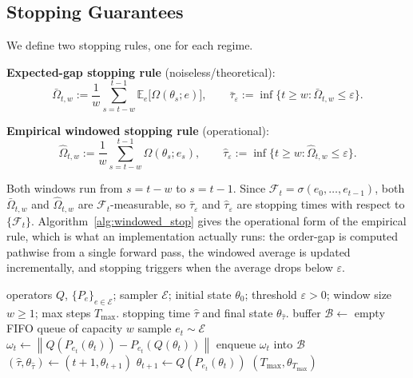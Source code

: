 \documentclass[12pt,a4paper]{article}
\newcommand{\E}{\mathcal{E}}
\newcommand{\norm}[1]{\left\lVert#1\right\rVert}
\newcommand{\Ogap}{\Omega}
\begin{document}
\subsection{Stopping Guarantees}
\label{sec:theory_stopping}

We define two stopping rules, one for each regime.

\textbf{Expected-gap stopping rule} (noiseless/theoretical):
\begin{equation}
\label{eq:expected_window}
\bar\Ogap_{t,w} := \frac{1}{w} \sum_{s = t-w}^{t-1}
  \mathbb{E}_e\bigl[\Ogap(\theta_s; e)\bigr],
\qquad
\bar\tau_\varepsilon := \inf\bigl\{t \geq w :
  \bar\Ogap_{t,w} \leq \varepsilon \bigr\}.
\end{equation}

\textbf{Empirical windowed stopping rule} (operational):
\begin{equation}
\label{eq:realized_window}
\widehat{\Ogap}_{t,w} := \frac{1}{w} \sum_{s = t-w}^{t-1} \Ogap(\theta_s; e_s),
\qquad
\hat\tau_\varepsilon := \inf\bigl\{t \geq w :
  \widehat{\Ogap}_{t,w} \leq \varepsilon \bigr\}.
\end{equation}

Both windows run from $s = t-w$ to $s = t-1$. Since $\mathcal{F}_t =
\sigma(e_0,\ldots,e_{t-1})$, both $\bar\Ogap_{t,w}$ and $\widehat{\Ogap}_{t,w}$
are $\mathcal{F}_t$-measurable, so $\bar\tau_\varepsilon$ and
$\hat\tau_\varepsilon$ are stopping times with respect to $\{\mathcal{F}_t\}$.
Algorithm~\ref{alg:windowed_stop} gives the operational form of the
empirical rule, which is what an implementation actually runs:
the order-gap is computed pathwise from a single forward pass, the
windowed average is updated incrementally, and stopping triggers when
the average drops below $\varepsilon$.

\begin{algorithm}[H]
\caption{Empirical windowed stopping (one trajectory)}
\label{alg:windowed_stop}
\begin{algorithmic}[1]
\Require operators $Q$, $\{P_e\}_{e \in \E}$; sampler $\E$;
         initial state $\theta_0$; threshold $\varepsilon > 0$;
         window size $w \geq 1$; max steps $T_{\max}$.
\Ensure stopping time $\hat\tau$ and final state $\theta_{\hat\tau}$.
\State buffer $\mathcal{B} \gets$ empty FIFO queue of capacity $w$
    \State sample $e_t \sim \E$
    \State $\omega_t \gets \norm{Q(P_{e_t}(\theta_t)) - P_{e_t}(Q(\theta_t))}$
    \State enqueue $\omega_t$ into $\mathcal{B}$
        \State \Return $(\hat\tau, \theta_{\hat\tau}) \gets (t+1, \theta_{t+1})$
    \EndIf
    \State $\theta_{t+1} \gets Q(P_{e_t}(\theta_t))$
\EndFor
\State \Return $(T_{\max}, \theta_{T_{\max}})$
\end{algorithmic}
\end{algorithm}
\end{document}

